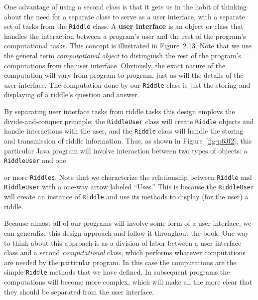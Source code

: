 One advantage of using a second class is that it gets us in the
habit of thinking about the need for a separate class to serve as a
user interface, with a separate set of tasks from the {\tt Riddle}
class. A {\bf user interface} is an object or class that handles the
interaction between a program's user and the rest of the program's
computational tasks. This concept is illustrated in Figure~2.13. Note
that we use the general term {\it computational object} to distinguish
the rest of the program's computations from the user interface.
Obviously, the exact nature of the computation will vary from program
to program, just as will the details of the user interface.  The
computation done by our {\tt Riddle} class is just the storing and
displaying of a riddle's question and answer.

By separating user interface tasks from riddle tasks this design
employs the divide-and-conquer principle: the {\tt RiddleUser} class
will create {\tt Riddle} objects and handle interactions with the
user, and the {\tt Riddle} class will handle the storing and
transmission of riddle information.  Thus, as shown in
Figure~\ref{fig-p63f2}, this particular Java program will involve
interaction between two types of objects: a {\tt RiddleUser} and one
\begin{figure}[h!]
\figaleft{chptr02/riddleuser.eps}{This UML class diagram represents an {\em association}
between the {\tt RiddleUser} and {\tt Riddle} classes.  The {\tt
Riddle\-User} class will {\em use} one or more objects of the {\tt
Riddle} class.
\label{fig-p63f2}
\label{pg-fig-p63f2}}
\end{figure}
or more {\tt Riddles}. Note that we characterize the relationship
between {\tt Riddle} and {\tt RiddleUser} with a one-way arrow labeled
``Uses.''  This is because the {\tt RiddleUser} will create an
instance of {\tt Riddle} and use its methods to display (for the user)
a riddle.

Because almost all of our programs will involve some form of a user
interface, we can generalize this design approach and follow it
throughout the book. One way to think about this approach is as a
division of labor between a user interface class and a second {\em
computational} class, which performs whatever computations are needed
by the particular program. In this case the computations are the simple
{\tt Riddle} methods that we have defined. In subsequent programs the
computations will become more complex, which will make all the more
clear that they should be separated from the user interface.
 

